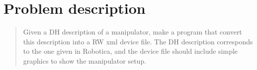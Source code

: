 \section{Problem description}
\label{sec:description}

\begin{quote}
Given a DH description of a manipulator, make a program that convert this description into a RW xml device file. The DH description corresponds to the one given in Robotica, and the device file should include simple graphics to show the manipulator setup.
\end{quote}
